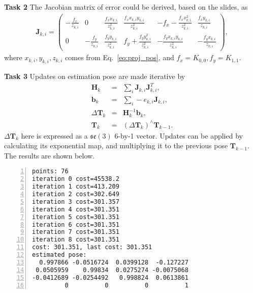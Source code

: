 \documentclass[12pt,a4paper]{article}
\newcommand{\vct}[1]{\boldsymbol{#1}}
\newcommand{\mtx}[1]{\mathbf{#1}}
\begin{document}
    \textsf{\textbf{Task 2}}
    The Jacobian matrix of error could be derived,
    based on the slides,
    as
    \begin{eqnarray}
      \mtx{J}_{k,i} = \begin{pmatrix}
        -\frac{f_x}{z_{k,i}} & 0 & \frac{f_x  x_{k,i}}{z_{k,i}^2} & \frac{f_x  x_{k,i} y_{k,i}}{z_{k,i}^2} & -f_x - \frac{f_x  x_{k,i}^2}{z_{k,i}^2} & \frac{f_x y_{k,i}}{z_{k,i}} \\
        0 & -\frac{f_y}{z_{k,i}} & \frac{f_y  y_{k,i}}{z_{k,i}^2} & f_y + \frac{f_y  y_{k,i}^2}{z_{k,i}^2} & -\frac{f_y x_{k,i} y_{k,i}}{z_{k,i}^2} & -\frac{f_y x_{k,i}}{z_{k,i}} 
      \end{pmatrix},
    \end{eqnarray}
    where $x_{k,i}, y_{k,i}, z_{k,i}$ comes from Eq.~\ref{eq:proj_pos},
    and $f_x = K_{0,0}, f_y = K_{1,1}$.

    \textsf{\textbf{Task 3}}
    Updates on estimation pose are made iterative by
    \begin{eqnarray}
      \mtx{H}_k &=& \sum_i \vct{J}_{k,i} \vct{J}_{k,i}^T, \nonumber\\
      \vct{b}_k &=& \sum_i - e_{k,i} \vct{J}_{k,i}, \nonumber\\
      \Delta \mtx{T}_k &=& \mtx{H}_k^{-1} \vct{b}_k, \nonumber\\
      \mtx{T}_k  &=& (\Delta \mtx{T}_k)^{\wedge}  \mtx{T}_{k-1}.
    \end{eqnarray}
    $\Delta \mtx{T}_k$ here is expressed as a $\mathfrak{se}(3)$ 6-by-1 vector.
    Updates can be applied by calculating its exponential map, 
    and multiplying it to the previous pose $\mtx{T}_{k-1}$.
    The results are shown below.
    \begin{lstlisting}[frame=single,numbers=left]
points: 76
iteration 0 cost=45538.2
iteration 1 cost=413.209
iteration 2 cost=302.649
iteration 3 cost=301.357
iteration 4 cost=301.351
iteration 5 cost=301.351
iteration 6 cost=301.351
iteration 7 cost=301.351
iteration 8 cost=301.351
cost: 301.351, last cost: 301.351
estimated pose: 
  0.997866 -0.0516724  0.0399128  -0.127227
 0.0505959    0.99834  0.0275274 -0.0075068
-0.0412689 -0.0254492   0.998824  0.0613861
         0          0          0          1
    \end{lstlisting}

    
\end{document}
